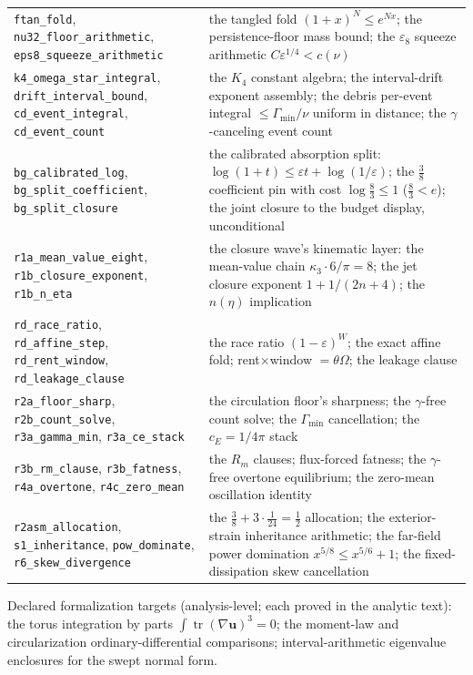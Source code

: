 \documentclass[11pt,letterpaper]{amsart}
\theoremstyle{definition}
\theoremstyle{remark}
\newcommand{\uu}{\boldsymbol{u}}
\begin{document}
{\begin{longtable}{@{}>{\raggedright\arraybackslash}p{}p{}@{}}
\texttt{ftan\_fold},
\texttt{nu32\_floor\_arithmetic},
\texttt{eps8\_squeeze\_arithmetic} & the tangled fold $(1+x)^N\le e^{Nx}$; the
persistence-floor mass bound; the $\varepsilon_8$ squeeze arithmetic
$C\varepsilon^{1/4}<c(\nu)$ \\
\texttt{k4\_omega\_star\_integral},
\texttt{drift\_interval\_bound},
\texttt{cd\_event\_integral},
\texttt{cd\_event\_count} & the $K_4$ constant algebra; the interval-drift
exponent assembly; the debris per-event integral $\le\Gamma_{\min}/\nu$
uniform in distance; the $\gamma$-canceling event count \\
\texttt{bg\_calibrated\_log},
\texttt{bg\_split\_coefficient},
\texttt{bg\_split\_closure} & the calibrated absorption split:
$\log(1+t)\le\varepsilon t+\log(1/\varepsilon)$; the $\tfrac38$ coefficient
pin with cost $\log\tfrac83\le1$ ($\tfrac83<e$); the joint closure to the
budget display, unconditional \\
\texttt{r1a\_mean\_value\_eight},
\texttt{r1b\_closure\_exponent}, \texttt{r1b\_n\_eta} & the closure wave's
kinematic layer: the mean-value chain $\kappa_3\cdot6/\pi=8$; the jet
closure exponent $1+1/(2n+4)$; the $n(\eta)$ implication \\
\texttt{rd\_race\_ratio}, \texttt{rd\_affine\_step},
\texttt{rd\_rent\_window}, \texttt{rd\_leakage\_clause} & the race ratio
$(1-\varepsilon)^W$; the exact affine fold; rent$\times$window
$=\theta\Omega$; the leakage clause \\
\texttt{r2a\_floor\_sharp}, \texttt{r2b\_count\_solve},
\texttt{r3a\_gamma\_min}, \texttt{r3a\_ce\_stack} & the circulation floor's
sharpness; the $\gamma$-free count solve; the $\Gamma_{\min}$ cancellation;
the $c_E=1/4\pi$ stack \\
\texttt{r3b\_rm\_clause}, \texttt{r3b\_fatness},
\texttt{r4a\_overtone}, \texttt{r4c\_zero\_mean} & the $R_m$ clauses;
flux-forced fatness; the $\gamma$-free overtone equilibrium; the zero-mean
oscillation identity \\
\texttt{r2asm\_allocation}, \texttt{s1\_inheritance},
\texttt{pow\_dominate}, \texttt{r6\_skew\_divergence} & the
$\tfrac38+3\cdot\tfrac1{24}=\tfrac12$
allocation; the exterior-strain inheritance arithmetic; the far-field power
domination $x^{5/8}\le x^{5/6}+1$; the fixed-dissipation skew cancellation \\
\bottomrule
\end{longtable}}

Declared formalization targets (analysis-level; each proved in the analytic text): the
torus integration by parts $\int\operatorname{tr}(\nabla\uu)^3=0$; the moment-law and
circularization ordinary-differential comparisons; interval-arithmetic eigenvalue
enclosures for the swept normal form.
\end{document}
